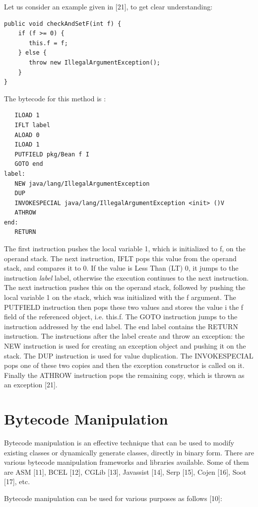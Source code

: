 Let us consider an example given in [21], to get clear understanding:
\begin{verbatim}
public void checkAndSetF(int f) {
    if (f >= 0) {
       this.f = f;
    } else {
       throw new IllegalArgumentException();
    }
}
\end{verbatim}

The bytecode for this method is :
\begin{verbatim}
   ILOAD 1
   IFLT label
   ALOAD 0
   ILOAD 1
   PUTFIELD pkg/Bean f I
   GOTO end
label:
   NEW java/lang/IllegalArgumentException
   DUP
   INVOKESPECIAL java/lang/IllegalArgumentException <init> ()V
   ATHROW
end:
   RETURN
\end{verbatim}

The first instruction pushes the local variable 1, which is initialized to f, on the operand stack. The next instruction, IFLT pops this value from the operand stack, and compares it to 0. If the value is Less Than (LT) 0, it jumps to the instruction \textit{label} label, otherwise the execution continues to the next instruction. The next instruction pushes this on the operand stack, followed by pushing the local variable 1 on the stack, which was initialized with the f argument. The PUTFIELD instruction then pops these two values and stores the value i the f field of the referenced object, i.e. this.f. The GOTO instruction jumps to the instruction addressed by the end label. The end label contains the RETURN instruction. The instructions after the label create and throw an exception: the NEW instruction is used for creating an exception object and pushing it on the stack. The DUP instruction is used for value duplication. The INVOKESPECIAL pops one of these two copies and then the exception constructor is called on it. Finally the ATHROW instruction pops the remaining copy, which is thrown as an exception [21].


\section{Bytecode Manipulation}
Bytecode manipulation is an effective technique that can be used to modify existing classes or dynamically generate classes, directly in binary form. There are various bytecode manipulation frameworks and libraries available. Some of them are ASM [11], BCEL [12], CGLib [13], Javassist [14], Serp [15], Cojen [16], Soot [17], etc.

Bytecode manipulation can be used for various purposes as follows [10]:

